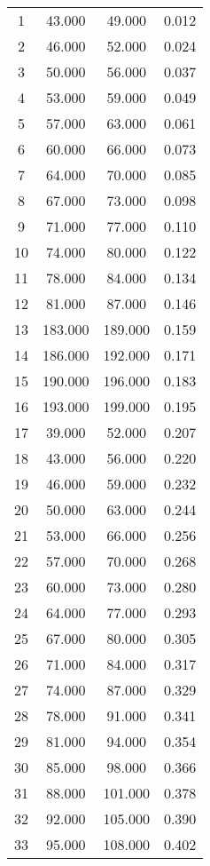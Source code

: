 % 
\begin{tabular}{cccc}
  \hline
  \hline
1 & 43.000 & 49.000 & 0.012 \\ 
  2 & 46.000 & 52.000 & 0.024 \\ 
  3 & 50.000 & 56.000 & 0.037 \\ 
  4 & 53.000 & 59.000 & 0.049 \\ 
  5 & 57.000 & 63.000 & 0.061 \\ 
  6 & 60.000 & 66.000 & 0.073 \\ 
  7 & 64.000 & 70.000 & 0.085 \\ 
  8 & 67.000 & 73.000 & 0.098 \\ 
  9 & 71.000 & 77.000 & 0.110 \\ 
  10 & 74.000 & 80.000 & 0.122 \\ 
  11 & 78.000 & 84.000 & 0.134 \\ 
  12 & 81.000 & 87.000 & 0.146 \\ 
  13 & 183.000 & 189.000 & 0.159 \\ 
  14 & 186.000 & 192.000 & 0.171 \\ 
  15 & 190.000 & 196.000 & 0.183 \\ 
  16 & 193.000 & 199.000 & 0.195 \\ 
  17 & 39.000 & 52.000 & 0.207 \\ 
  18 & 43.000 & 56.000 & 0.220 \\ 
  19 & 46.000 & 59.000 & 0.232 \\ 
  20 & 50.000 & 63.000 & 0.244 \\ 
  21 & 53.000 & 66.000 & 0.256 \\ 
  22 & 57.000 & 70.000 & 0.268 \\ 
  23 & 60.000 & 73.000 & 0.280 \\ 
  24 & 64.000 & 77.000 & 0.293 \\ 
  25 & 67.000 & 80.000 & 0.305 \\ 
  26 & 71.000 & 84.000 & 0.317 \\ 
  27 & 74.000 & 87.000 & 0.329 \\ 
  28 & 78.000 & 91.000 & 0.341 \\ 
  29 & 81.000 & 94.000 & 0.354 \\ 
  30 & 85.000 & 98.000 & 0.366 \\ 
  31 & 88.000 & 101.000 & 0.378 \\ 
  32 & 92.000 & 105.000 & 0.390 \\ 
  33 & 95.000 & 108.000 & 0.402 \\ 

\end{tabular}
